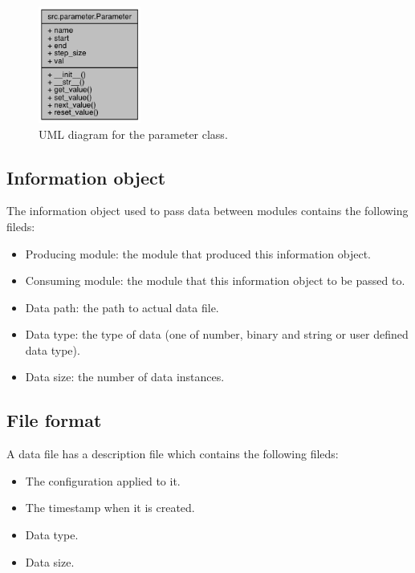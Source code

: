 \documentclass{article}
\begin{document}
    \begin{figure}[H]
        \begin{center}
            \includegraphics[width=0.3\textwidth]{fig/param_uml.png}
        \end{center}
        \label{fig:param_uml}
        \caption{UML diagram for the parameter class.}
    \end{figure}

    \subsection{Information object}
    The information object used to pass data between modules contains the following fileds:

    \begin{itemize}
        \item Producing module: the module that produced this information object.
        \item Consuming module: the module that this information object to be passed to.
        \item Data path: the path to actual data file.
        \item Data type: the type of data (one of number, binary and string or user defined data type).
        \item Data size: the number of data instances.
    \end{itemize}

    \subsection{File format}
    A data file has a description file which contains the following fileds:

    \begin{itemize}
        \item The configuration applied to it.
        \item The timestamp when it is created.
        \item Data type.
        \item Data size.
    \end{itemize}
\end{document}
